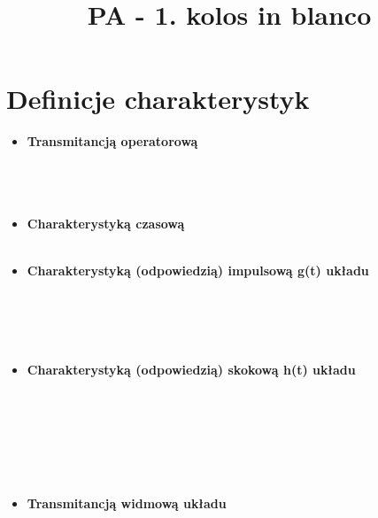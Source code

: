\documentclass[a4paper]{article}
\author{}
\title{PA - 1. kolos in blanco}
\date{}
\begin{document}
\maketitle
\section{Definicje charakterystyk}
\begin{itemize}
\item \textbf{Transmitancją operatorową} \\\\\\\\
\item \textbf{Charakterystyką czasową} \\\\
\item \textbf{Charakterystyką (odpowiedzią) impulsową g(t) układu} \\\\\\\\\\
\item \textbf{Charakterystyką (odpowiedzią) skokową h(t) układu} \\\\\\\\\\\\\\
\item \textbf{Transmitancją widmową układu} \\\\\\\\\\\\\\\\\\\\
\end{itemize}
\end{document}
